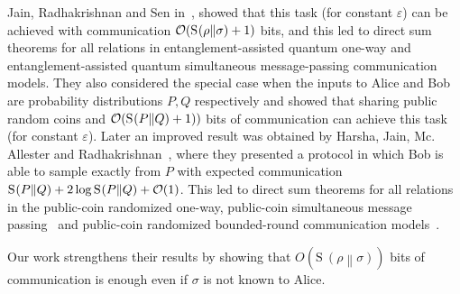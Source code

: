 \documentclass[11pt,a4paper]{article}
\def\O{\CMcal{O}}
\theoremstyle{plain}
\theoremstyle{definition}
\newcommand {\br} [1] {\ensuremath{ \left( #1 \right) }}
\newcommand {\minusspace} {\: \! \!}
\newcommand {\fn} [2] {\ensuremath{ #1 \minusspace \br{ #2 } }}
\newcommand {\relent} [2] {\fn{\mathrm{S}}{#1 \middle\| #2}}
\def\ve{{\varepsilon}}
\begin{document}
Jain, Radhakrishnan and Sen in~\cite{Jain:2005:PEM:1068502.1068658,Jain:2008}, showed that this task  (for constant $\ve$) can be achieved with  communication $\O(\relent{\rho}{\sigma} +1)$ bits, and this led to direct sum theorems for all relations in  entanglement-assisted quantum one-way and entanglement-assisted quantum simultaneous message-passing communication models. They also considered the special case when the inputs to Alice and Bob are probability distributions $P,Q$ respectively and showed that sharing public random coins and $\O(\relent{P}{Q}+1))$ bits of  communication can achieve this task (for constant $\ve$). Later an improved result was obtained by Harsha, Jain, Mc. Allester and Radhakrishnan~\cite{Harsha:2010}, where they presented a protocol in which Bob is able to sample exactly from $P$ with expected communication $\relent{P}{Q}+2\log\relent{P}{Q}+\O(1)$.  This led to direct sum theorems for all relations in the public-coin  randomized one-way, public-coin simultaneous message passing~\cite{Jain:2005:PEM:1068502.1068658,Jain:2008} and public-coin  randomized bounded-round communication models~\cite{Harsha:2010}.

Our work strengthens their results by showing that $O(\relent{\rho}{\sigma})$ bits of communication is enough even if $\sigma$ is not known to Alice.
\end{document}
